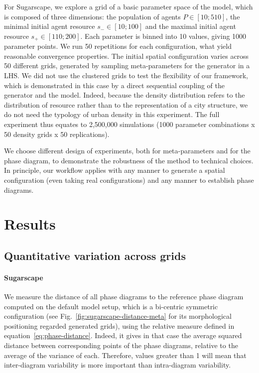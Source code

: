 \documentclass[Royal,sageh,times]{sagej}
\begin{document}
For Sugarscape, we explore a grid of a basic parameter space of the model, which is composed of three dimensions: the population of agents $P\in \left[10;510\right]$, the minimal initial agent resource $s_{-}\in \left[10;100\right]$ and the maximal initial agent resource $s_{+}\in \left[110;200\right]$. Each parameter is binned into 10 values, giving 1000 parameter points. We run 50 repetitions for each configuration, what yield reasonable convergence properties. The initial spatial configuration varies across 50 different grids, generated by sampling meta-parameters for the generator in a LHS. We did not use the clustered grids to test the flexibility of our framework, which is demonstrated in this case by a direct sequential coupling of the generator and the model. Indeed, because the density distribution refers to the distribution of resource rather than to the representation of a city structure, we do not need the typology of urban density in this experiment. The full experiment thus equates to 2,500,000 simulations (1000 parameter combinations x 50 density grids x 50 replications). 


We choose different design of experiments, both for meta-parameters and for the phase diagram, to demonstrate the robustness of the method to technical choices. In principle, our workflow applies with any manner to generate a spatial configuration (even taking real configurations) and any manner to establish phase diagrams.




\section{Results}


\subsection{Quantitative variation across grids}



\paragraph{Sugarscape} We measure the distance of all phase diagrams to the reference phase diagram computed on the default model setup, which is a bi-centric symmetric configuration (see Fig.~\ref{fig:sugarscape-distance-meta} for its morphological positioning regarded generated grids), using the relative measure defined in equation~\ref{eq:phase-distance}. Indeed, it gives in that case the average squared distance between corresponding points of the phase diagrams, relative to the average of the variance of each. Therefore, values greater than 1 will mean that inter-diagram variability is more important than intra-diagram variability.
\end{document}
